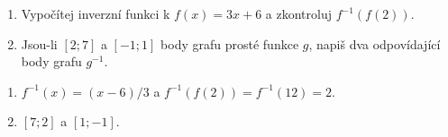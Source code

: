 \documentclass[11pt,a4paper]{article}
\begin{document}
\begin{zadaniReseniBox}[title={Domácí úkol}]
\begin{enumerate}[label=\alph*)]
\item Vypočítej inverzní funkci k $f(x)=3x+6$ a zkontroluj $f^{-1}(f(2))$.
\item Jsou-li $[2;7]$ a $[-1;1]$ body grafu prosté funkce $g$, napiš dva odpovídající body grafu $g^{-1}$.
\end{enumerate}
\tcblower
\begin{enumerate}[label=\alph*)]
\item $f^{-1}(x)=(x-6)/3$ a $f^{-1}(f(2))=f^{-1}(12)=2$.
\item $[7;2]$ a $[1;-1]$.
\end{enumerate}
\end{zadaniReseniBox}
\end{document}
